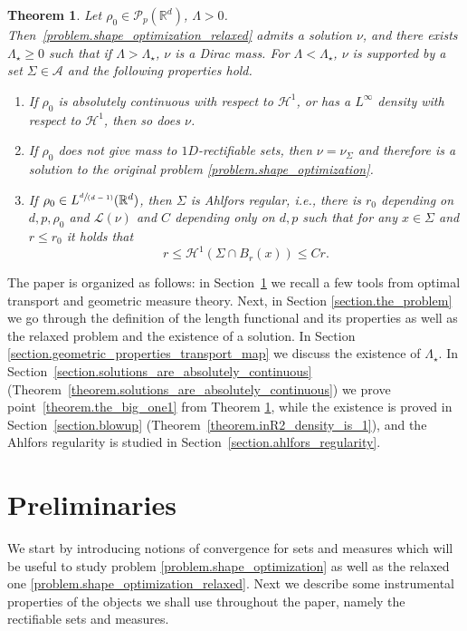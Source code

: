 \documentclass[11pt]{article}
\newcommand{\ie}{i.e.,\xspace}
\numberwithin{equation}{section}
\newcommand{\spfrac}[2]{\sfrac{#1}{(#2)}}
\newtheorem{theorem}{Theorem}[section]
\theoremstyle{definition}
\newcommand\cH{\mathcal{H}}
\newcommand{\RR}{\mathbb{R}}
\begin{document}
\begin{theorem}\label{theorem.the_big_one}
Let $\rho_0 \in \mathcal{P}_p(\RR^d)$, $\Lambda>0$. Then~\eqref{problem.shape_optimization_relaxed} admits a solution $\nu$, and there exists $\Lambda_\star \ge 0$ such that if $\Lambda>\Lambda_\star$, $\nu$ is a Dirac mass. For $\Lambda<\Lambda_\star$, $\nu$ is supported by a set $\Sigma \in \mathcal{A}$ and the following properties hold.
\begin{enumerate}
\item\label{theorem.the_big_one1}
If $\rho_0$ is absolutely continuous with respect to $\cH^1$, or has a $L^\infty$ density with respect to $\cH^1$, then so does $\nu$.
\item\label{theorem.the_big_one2}
If $\rho_0$ does not give mass to $1D$-rectifiable sets, then $\nu=\nu_\Sigma$ and therefore is a solution to the original problem \eqref{problem.shape_optimization}.
\item\label{theorem.the_big_one3}
If $\rho_0 \in L^{\spfrac{d}{d-1}}(\RR^d)$, then $\Sigma$ is Ahlfors regular, \ie there is $r_0$ depending on $d,p,\rho_0$ and $\mathcal{L}(\nu)$ and $C$ depending only on $d,p$ such that for any $x \in \Sigma$ and $r \le r_0$ it holds that
\[
r \le \cH^1(\Sigma \cap B_r(x))\le Cr.
\]
\end{enumerate}
\end{theorem}

The paper is organized as follows: in Section~\ref{section.preliminary_properties} we recall a few tools from optimal transport and geometric measure theory. Next, in Section \ref{section.the_problem} we go through the definition of the length functional and its properties as well as the relaxed problem and the existence of a solution. In Section \ref{section.geometric_properties_transport_map} we discuss
the existence of $\Lambda_\star$.
In Section~\ref{section.solutions_are_absolutely_continuous}
(Theorem~\ref{theorem.solutions_are_absolutely_continuous}) we prove point~\eqref{theorem.the_big_one1} from Theorem \ref{theorem.the_big_one}, while the existence is proved in Section~\ref{section.blowup} (Theorem~\ref{theorem.inR2_density_is_1}),
and the Ahlfors regularity is studied in Section~\ref{section.ahlfors_regularity}.

\section{Preliminaries}\label{section.preliminary_properties}
We start by introducing notions of convergence for sets and measures which will be useful to study problem \eqref{problem.shape_optimization} as well as the relaxed one \eqref{problem.shape_optimization_relaxed}. Next we describe some instrumental properties of the objects we shall use throughout the paper, namely the rectifiable sets and measures.
\end{document}
